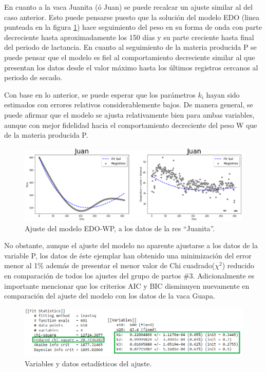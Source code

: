 \begin{itemize}
    En cuanto a la vaca Juanita (ó Juan) se puede recalcar un ajuste similar al del caso anterior. Esto puede pensarse puesto que la solución del modelo EDO (linea punteada en la figura \ref{ajustemodJuanpng}) hace seguimiento del peso en su forma de onda con parte decreciente hasta aproximadamente los 150 días y su parte creciente hasta final del periodo de lactancia. En cuanto al seguimiento de la materia producida P se puede pensar que el modelo es fiel al comportamiento decreciente similar al que presentan los datos desde el valor máximo hasta los últimos registros cercanos al periodo de secado.
    
    Con base en lo anterior, se puede esperar que los parámetros $k_{i}$ hayan sido estimados con errores relativos considerablemente bajos. De manera general, se puede afirmar  que el modelo se ajusta relativamente bien para ambas variables, aunque con mejor fidelidad hacia el comportamiento decreciente del peso W que de la materia producida P. 
    
    \begin{figure}[H]
            \centering
            \includegraphics[scale=0.49]{img/ajustemodJuan.png}
            \caption{Ajuste del modelo EDO-WP, a los datos de la res ``Juanita''.}
            \label{ajustemodJuanpng}
        \end{figure}
    No obstante, aunque el ajuste del modelo no aparente ajustarse a los datos de la variable P, los datos de éste ejemplar han obtenido una minimización del error menor al 1\% además de presentar el menor valor de Chi cuadrado($\chi^{2}$)  reducido en comparación de todos los ajustes del grupo de partos \#3. Adicionalmente es importante mencionar que los criterios AIC y BIC disminuyen nuevamente en comparación del ajuste del modelo con los datos de la vaca Guapa.

        \begin{figure}[H]
            \centering
            \includegraphics[scale=0.55]{img/ajustemodJuanstats.png}
            \caption{Variables y datos estadísticos del ajuste.}
            \label{ajustemodJuanstatspng}
        \end{figure}


\end{itemize}

